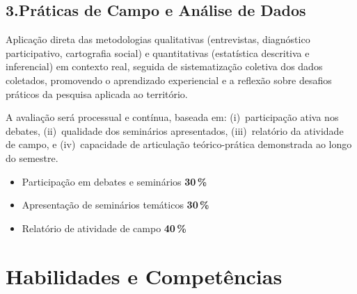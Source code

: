 \documentclass[11pt,a4paper]{article}
\begin{document}
\subsection*{3.\enspace Práticas de Campo e Análise de Dados}
Aplicação direta das metodologias qualitativas (entrevistas, diagnóstico participativo, cartografia social) e quantitativas (estatística descritiva e inferencial) em contexto real, seguida de sistematização coletiva dos dados coletados, promovendo o aprendizado experiencial e a reflexão sobre desafios práticos da pesquisa aplicada ao território.

\vspace{6pt}
A avaliação será processual e contínua, baseada em: (i)~participação ativa nos debates, (ii)~qualidade dos seminários apresentados, (iii)~relatório da atividade de campo, e (iv)~capacidade de articulação teórico-prática demonstrada ao longo do semestre.

\begin{tcolorbox}[uefsbox, colframe=uefsaccent, colback=white, title={\bfseries\color{white}\scshape Avaliação}, fonttitle=\normalsize, coltitle=white, colbacktitle=uefsaccent, attach boxed title to top left={yshift=-2mm,xshift=2mm}, boxed title style={arc=2pt,boxrule=0pt}]
\begin{itemize}[leftmargin=1.2em]
\item Participação em debates e seminários\,\dotfill\,\textbf{30\,\%}
\item Apresentação de seminários temáticos\,\dotfill\,\textbf{30\,\%}
\item Relatório de atividade de campo\,\dotfill\,\textbf{40\,\%}
\end{itemize}
\end{tcolorbox}

\section*{Habilidades e Competências}
\end{document}
